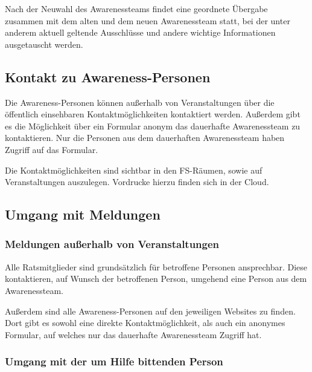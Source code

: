 \documentclass{article}
\begin{document}
Nach der Neuwahl des Awarenessteams findet eine geordnete Übergabe zusammen mit dem alten und dem neuen Awarenessteam statt, bei der unter anderem aktuell geltende 
Ausschlüsse und andere wichtige Informationen ausgetauscht werden.

\subsection{Kontakt zu Awareness-Personen}
Die Awareness-Personen können außerhalb von Veranstaltungen über die öffentlich einsehbaren Kontaktmöglichkeiten kontaktiert werden. %
Außerdem gibt es die Möglichkeit über ein Formular anonym das dauerhafte Awarenessteam zu kontaktieren. Nur die Personen aus dem dauerhaften Awarenessteam haben Zugriff auf das Formular. %

Die Kontaktmöglichkeiten sind sichtbar in den FS-Räumen, sowie auf Veranstaltungen auszulegen. Vordrucke hierzu finden sich in der Cloud. 

\subsection{Umgang mit Meldungen}
\subsubsection{Meldungen außerhalb von Veranstaltungen}
Alle Ratsmitglieder sind grundsätzlich für betroffene Personen ansprechbar. Diese kontaktieren, auf Wunsch der betroffenen Person, umgehend eine Person aus dem Awarenessteam. 

Außerdem sind alle Awareness-Personen auf den jeweiligen Websites zu finden. Dort gibt es sowohl eine direkte Kontaktmöglichkeit, als auch ein anonymes Formular, auf welches 
nur das dauerhafte Awarenessteam Zugriff hat.

\subsubsection{Umgang mit der um Hilfe bittenden Person}
\end{document}
